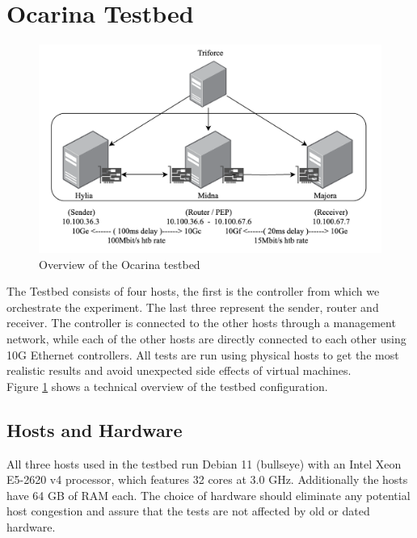 \documentclass[a4paper,english, 12pt]{report}
\begin{document}


\section{Ocarina Testbed}
\begin{figure}[h!] %
	\centering
	\includegraphics[scale=0.60]{../diagrams/drawio/testbed.png}
  	\caption{Overview of the Ocarina testbed}
  	\label{fig:testbed}
\end{figure}

The Testbed consists of four hosts, the first is the controller from which we orchestrate the experiment. The last three represent the sender, router and receiver. The controller is connected to the other hosts through a management network, while each of the other hosts are directly connected to each other using 10G Ethernet controllers. All tests are run using physical hosts to get the most realistic results and avoid unexpected side effects of virtual machines.\\

Figure \ref{fig:testbed} shows a technical overview of the testbed configuration.

\subsection{Hosts and Hardware}
All three hosts used in the testbed run Debian 11 (bullseye) with an Intel Xeon E5-2620 v4 processor, which features 32 cores at 3.0 GHz. Additionally the hosts have 64 GB of RAM each. The choice of hardware should eliminate any potential host congestion \cite{Agarwal_Krishnamurthy_Agarwal_2023} and assure that the tests are not affected by old or dated hardware.\\
\end{document}
